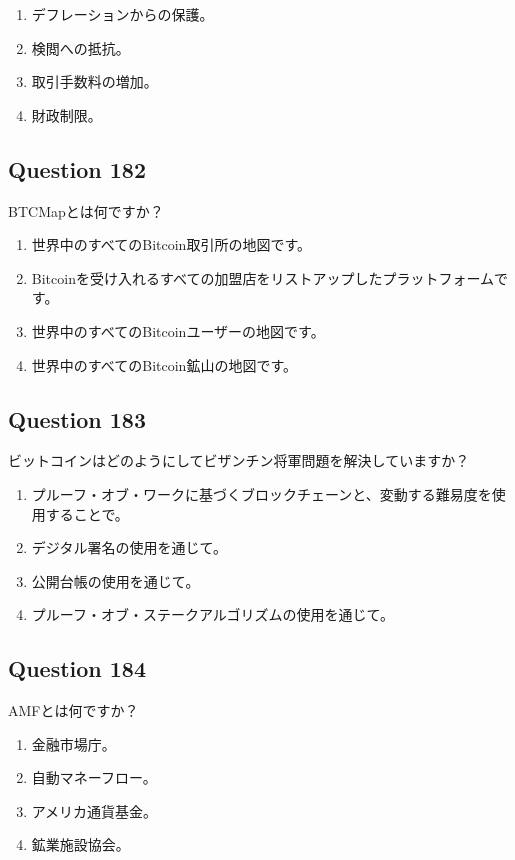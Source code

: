 \documentclass[12pt,a4paper]{article}
\begin{document}
\begin{enumerate}[label=\Alph*., leftmargin=*]
\item デフレーションからの保護。
\item 検閲への抵抗。
\item 取引手数料の増加。
\item 財政制限。
\end{enumerate}

\bigskip


\subsection*{Question 182}
BTCMapとは何ですか？

\begin{enumerate}[label=\Alph*., leftmargin=*]
\item 世界中のすべてのBitcoin取引所の地図です。
\item Bitcoinを受け入れるすべての加盟店をリストアップしたプラットフォームです。
\item 世界中のすべてのBitcoinユーザーの地図です。
\item 世界中のすべてのBitcoin鉱山の地図です。
\end{enumerate}

\bigskip


\subsection*{Question 183}
ビットコインはどのようにしてビザンチン将軍問題を解決していますか？

\begin{enumerate}[label=\Alph*., leftmargin=*]
\item プルーフ・オブ・ワークに基づくブロックチェーンと、変動する難易度を使用することで。
\item デジタル署名の使用を通じて。
\item 公開台帳の使用を通じて。
\item プルーフ・オブ・ステークアルゴリズムの使用を通じて。
\end{enumerate}

\bigskip


\subsection*{Question 184}
AMFとは何ですか？

\begin{enumerate}[label=\Alph*., leftmargin=*]
\item 金融市場庁。
\item 自動マネーフロー。
\item アメリカ通貨基金。
\item 鉱業施設協会。
\end{enumerate}
\end{document}
